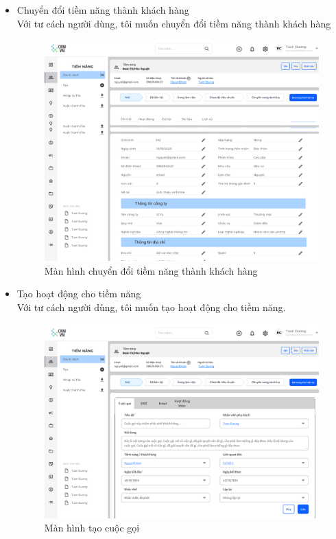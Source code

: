 \documentclass[12pt,a4paper]{article}
\begin{document}
\begin{enumerate}
\begin{itemize}
            \item Chuyển đổi tiềm năng thành khách hàng \\
            Với tư cách người dùng, tôi muốn chuyển đổi tiềm năng thành khách hàng
            \begin{figure}[H]
                \centering \includegraphics[width=\textwidth]{Img/Nguyet/chitiettiemnang.png}
                \vspace{0.5cm}
                \caption{Màn hình chuyển đổi tiềm năng thành khách hàng}
                \label{chuyenthanhkh}
            \end{figure}

            \item Tạo hoạt động cho tiềm năng \\
            Với tư cách người dùng, tôi muốn tạo hoạt động cho tiềm năng.
            \begin{figure}[H]
                \centering \includegraphics[width=\textwidth]{Img/Nguyet/hdcgoitn.png}
                \vspace{0.5cm}
                \caption{Màn hình tạo cuộc gọi}
                \label{goitn}
            \end{figure}


\end{itemize}
\end{enumerate}
\end{document}
